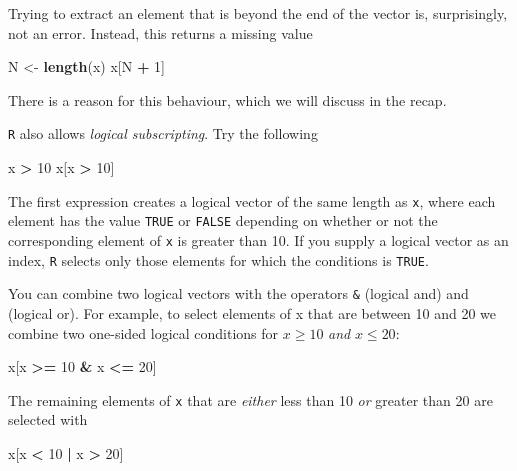 \documentclass[
]{book}
\newenvironment{Shaded}{\begin{snugshade}}{\end{snugshade}}
\newcommand{\DecValTok}[1]{\textcolor[rgb]{0.00,0.00,0.81}{#1}}
\newcommand{\FunctionTok}[1]{\textcolor[rgb]{0.13,0.29,0.53}{\textbf{#1}}}
\newcommand{\NormalTok}[1]{#1}
\newcommand{\OtherTok}[1]{\textcolor[rgb]{0.56,0.35,0.01}{#1}}
\newcommand{\SpecialCharTok}[1]{\textcolor[rgb]{0.81,0.36,0.00}{\textbf{#1}}}
\begin{document}
Trying to extract an element that is beyond the end of the vector is,
surprisingly, not an error. Instead, this returns a missing value

\begin{Shaded}
\begin{Highlighting}[]
\NormalTok{N }\OtherTok{\textless{}{-}} \FunctionTok{length}\NormalTok{(x)}
\NormalTok{x[N }\SpecialCharTok{+} \DecValTok{1}\NormalTok{]}
\end{Highlighting}
\end{Shaded}

There is a reason for this behaviour, which we will discuss in the recap.

\texttt{R} also allows \emph{logical subscripting}. Try the following

\begin{Shaded}
\begin{Highlighting}[]
\NormalTok{x }\SpecialCharTok{\textgreater{}} \DecValTok{10}
\NormalTok{x[x }\SpecialCharTok{\textgreater{}} \DecValTok{10}\NormalTok{]}
\end{Highlighting}
\end{Shaded}

The first expression creates a logical vector of the same length as
\texttt{x}, where each element has the value \texttt{TRUE} or
\texttt{FALSE} depending on whether or not the corresponding element
of \texttt{x} is greater than 10. If you supply a logical vector as an
index, \texttt{R} selects only those elements for which the conditions is
\texttt{TRUE}.

You can combine two logical vectors with the operators \texttt{\&}
(logical and) and \texttt{\textbar{}} (logical or). For example, to select
elements of x that are between 10 and 20 we combine two one-sided logical
conditions for \(x \geq 10\) \emph{and} \(x \leq 20\):

\begin{Shaded}
\begin{Highlighting}[]
\NormalTok{x[x }\SpecialCharTok{\textgreater{}=} \DecValTok{10} \SpecialCharTok{\&}\NormalTok{ x }\SpecialCharTok{\textless{}=} \DecValTok{20}\NormalTok{]}
\end{Highlighting}
\end{Shaded}

The remaining elements of \texttt{x} that are \emph{either} less than 10
\emph{or} greater than 20 are selected with

\begin{Shaded}
\begin{Highlighting}[]
\NormalTok{x[x }\SpecialCharTok{\textless{}} \DecValTok{10} \SpecialCharTok{|}\NormalTok{ x }\SpecialCharTok{\textgreater{}} \DecValTok{20}\NormalTok{]}
\end{Highlighting}
\end{Shaded}
\end{document}
